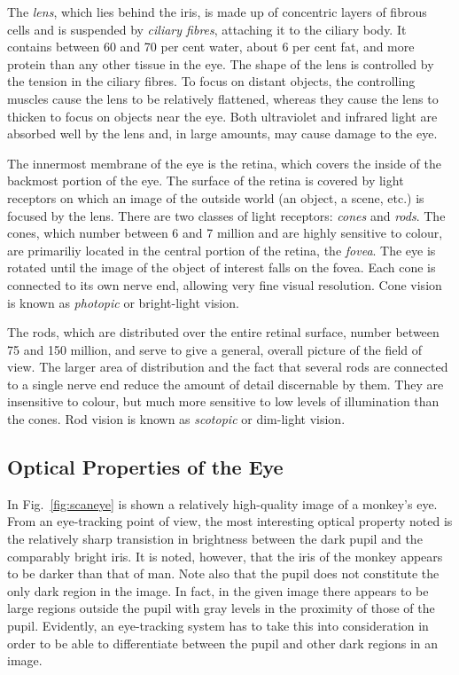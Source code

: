
The {\em lens\/}, which lies behind the iris, is made up of concentric
layers of fibrous cells and is suspended by {\em ciliary fibres\/},
attaching it to the ciliary body.  It contains between 60 and 70 per
cent water, about 6 per cent fat, and more protein than any other
tissue in the eye.  The shape of the lens is controlled by the tension
in the ciliary fibres.  To focus on distant objects, the controlling
muscles cause the lens to be relatively flattened, whereas they cause
the lens to thicken to focus on objects near the eye.  Both
ultraviolet and infrared light are absorbed well by the lens and, in
large amounts, may cause damage to the eye.

The innermost membrane of the eye is the retina, which covers the
inside of the backmost portion of the eye.  The surface of the retina
is covered by light receptors on which an image of the outside world
(an object, a scene, etc.) is focused by the lens.  There are two
classes of light receptors: {\em cones\/} and {\em rods\/}.  The
cones, which number between 6 and 7 million and are highly sensitive
to colour, are primariliy located in the central portion of the
retina, the {\em fovea\/}.  The eye is rotated until the image of the
object of interest falls on the fovea.  Each cone is connected to its
own nerve end, allowing very fine visual resolution.  Cone vision is
known as {\em photopic\/} or bright-light vision.

The rods, which are distributed over the entire retinal surface,
number between 75 and 150 million, and serve to give a general,
overall picture of the field of view.  The larger area of distribution
and the fact that several rods are connected to a single nerve end
reduce the amount of detail discernable by them.  They are insensitive
to colour, but much more sensitive to low levels of illumination than
the cones.  Rod vision is known as {\em scotopic\/} or dim-light
vision.

\subsection{Optical Properties of the Eye}
\label{back:eye:visual}

In Fig.~\ref{fig:scaneye} is shown a relatively high-quality image of
a monkey's eye.  From an eye-tracking point of view, the most
interesting optical property noted is the relatively sharp transistion
in brightness between the dark pupil and the comparably bright iris.
It is noted, however, that the iris of the monkey appears to be darker
than that of man.  Note also that the pupil does not constitute the
only dark region in the image.  In fact, in the given image there
appears to be large regions outside the pupil with gray levels in the
proximity of those of the pupil.  Evidently, an eye-tracking system
has to take this into consideration in order to be able to
differentiate between the pupil and other dark regions in an image.

